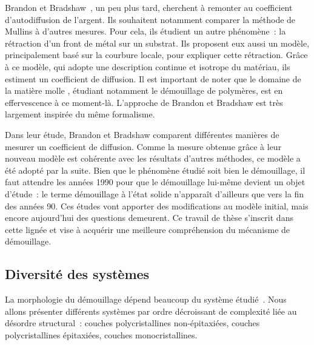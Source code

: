 Brandon et Bradshaw~\cite{brandon1966mobility}, un peu plus tard, cherchent à remonter au coefficient d'autodiffusion de l'argent. Ils souhaitent notamment comparer la méthode de Mullins à d'autres mesures. Pour cela, ils étudient un autre phénomène~: la rétraction d'un front de métal sur un substrat. Ils proposent eux aussi un modèle, principalement basé sur la courbure locale, pour expliquer cette rétraction. Grâce à ce modèle, qui adopte une description continue et isotrope
du matériau, ils estiment un coefficient de diffusion. Il est important de noter que le domaine de la \og matière molle \fg{}, étudiant notamment le démouillage de polymères, est en effervescence à ce moment-là. L'approche de Brandon et Bradshaw est très largement inspirée du même formalisme.\par 
Dans leur étude, Brandon et Bradshaw comparent différentes manières de mesurer un coefficient de diffusion. Comme la mesure obtenue grâce à leur nouveau modèle est cohérente avec les résultats d'autres méthodes, ce modèle a été adopté par la suite. Bien que le phénomène étudié soit bien le démouillage, il faut attendre les années 1990 pour que le démouillage lui-même
devient un objet d'étude~: le terme \og démouillage à l'état solide \fg{} n'apparaît d'ailleurs que vers la fin des années 90. Ces études vont apporter des modifications au modèle initial, mais encore aujourd'hui des questions demeurent. Ce travail de thèse s'inscrit dans cette lignée et vise à acquérir une meilleure compréhension du mécanisme de démouillage.\par 

	\subsection{Diversité des systèmes}
La morphologie du démouillage dépend beaucoup du système étudié~\cite{thompson2012solid}. Nous allons présenter différents systèmes par ordre décroissant de complexité liée au désordre structural~: couches polycristallines non-épitaxiées, couches polycristallines épitaxiées, couches monocristallines.

